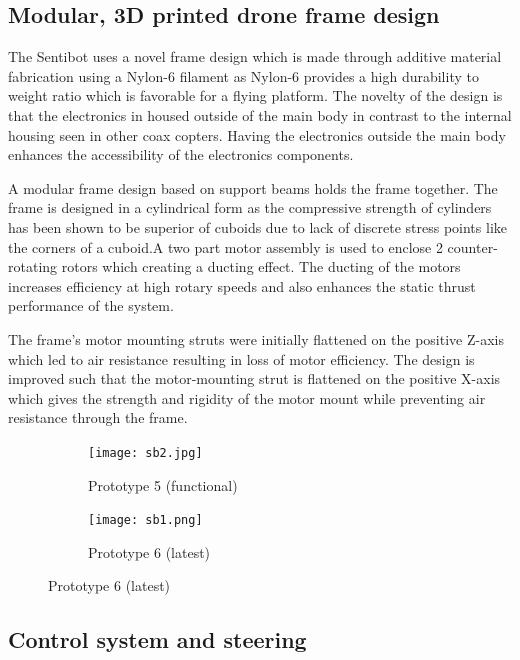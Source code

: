 \documentclass[12pt]{article}
\begin{document}
\subsection{Modular, 3D printed drone frame design}

The Sentibot uses a novel frame design which is made through additive material fabrication using a Nylon-6 filament as Nylon-6 provides a high durability to weight ratio which is favorable for a flying platform\cite{3Dprinting}. The novelty of the design is that the electronics in housed outside of the main body in contrast to the internal housing seen in other coax copters\cite{SFV}. Having the electronics outside the main body enhances the accessibility of the electronics components. 

A modular frame design based on support beams holds the frame together. The frame is designed in a cylindrical form as the compressive strength of cylinders has been shown to be superior of cuboids due to lack of discrete stress points like the corners of a cuboid\cite{cylinderstrength}.A two part motor assembly is used to enclose 2 counter-rotating rotors which creating a ducting effect. The ducting of the motors increases efficiency at high rotary speeds and also enhances the static thrust performance of the system\cite{ductedfan}.

The frame's motor mounting struts were initially flattened on the positive Z-axis which led to air resistance resulting in loss of motor efficiency. The design is improved such that the motor-mounting strut is flattened on the positive X-axis which gives the strength and rigidity of the motor mount while preventing air resistance through the frame.

\begin{figure}
	\centering
	\begin{subfigure}{0.5\textwidth}
		\centering
		\texttt{[image: sb2.jpg]}
		\caption{Prototype 5 (functional)}
		\label{fig:sb-topdown}
	\end{subfigure}%
	\begin{subfigure}{0.5\textwidth}
		\centering
		\texttt{[image: sb1.png]}
	\caption{Prototype 6 (latest)}
	\label{fig:sb-side}
	\end{subfigure}
\end{figure}

\subsection{Control system and steering}
\end{document}

